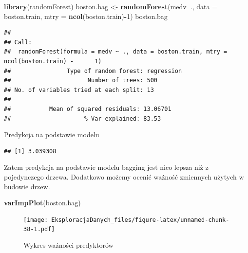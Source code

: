 \documentclass[]{book}
\newenvironment{Shaded}{\begin{snugshade}}{\end{snugshade}}
\newcommand{\DataTypeTok}[1]{\textcolor[rgb]{0.13,0.29,0.53}{#1}}
\newcommand{\DecValTok}[1]{\textcolor[rgb]{0.00,0.00,0.81}{#1}}
\newcommand{\KeywordTok}[1]{\textcolor[rgb]{0.13,0.29,0.53}{\textbf{#1}}}
\newcommand{\NormalTok}[1]{#1}
\newcommand{\OperatorTok}[1]{\textcolor[rgb]{0.81,0.36,0.00}{\textbf{#1}}}
\newcommand{\StringTok}[1]{\textcolor[rgb]{0.31,0.60,0.02}{#1}}
\theoremstyle{plain}
\theoremstyle{definition}
\theoremstyle{definition}
\theoremstyle{definition}
\theoremstyle{definition}
\theoremstyle{remark}
\begin{document}
\begin{Shaded}
\begin{Highlighting}[]
\KeywordTok{library}\NormalTok{(randomForest)}
\NormalTok{boston.bag <-}\StringTok{ }\KeywordTok{randomForest}\NormalTok{(medv}\OperatorTok{~}\NormalTok{., }\DataTypeTok{data =}\NormalTok{ boston.train, }
                           \DataTypeTok{mtry =} \KeywordTok{ncol}\NormalTok{(boston.train)}\OperatorTok{-}\DecValTok{1}\NormalTok{)}
\NormalTok{boston.bag}
\end{Highlighting}
\end{Shaded}

\begin{verbatim}
## 
## Call:
##  randomForest(formula = medv ~ ., data = boston.train, mtry = ncol(boston.train) -      1) 
##                Type of random forest: regression
##                      Number of trees: 500
## No. of variables tried at each split: 13
## 
##           Mean of squared residuals: 13.06701
##                     % Var explained: 83.53
\end{verbatim}

Predykcja na podstawie modelu

\begin{Shaded}
\end{Shaded}

\begin{verbatim}
## [1] 3.039308
\end{verbatim}

Zatem predykcja na podstawie modelu bagging jest nico lepsza niż z pojedynczego drzewa. Dodatkowo możemy ocenić ważność zmiennych użytych w budowie drzew.

\begin{Shaded}
\begin{Highlighting}[]
\KeywordTok{varImpPlot}\NormalTok{(boston.bag)}
\end{Highlighting}
\end{Shaded}

\begin{figure}
\centering
\texttt{[image: EksploracjaDanych\_files/figure-latex/unnamed-chunk-38-1.pdf]}
\caption{\label{fig:unnamed-chunk-38}Wykres ważności predyktorów}
\end{figure}
\end{document}

